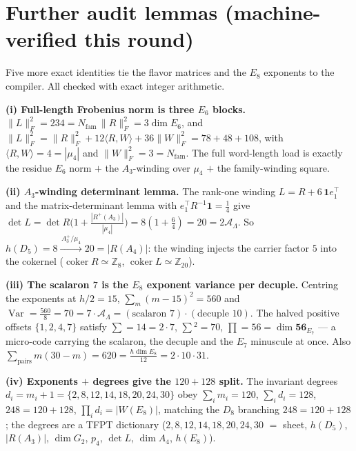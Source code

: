 \documentclass[11pt,a4paper]{article}
\newcommand{\Nfam}{N_{\mathrm{fam}}}
\newcommand{\AL}{\mathcal A_\Lambda}
\newcommand{\Z}{\mathbb{Z}}
\theoremstyle{definition}
\begin{document}
\section{Further audit lemmas (machine-verified this round)}
Five more exact identities tie the flavor matrices and the $E_8$ exponents to the compiler. All checked
with exact integer arithmetic.

\par\smallskip\noindent\textbf{(i) Full-length Frobenius norm is three $E_6$ blocks.}
$\|L\|_F^2=234=\Nfam\,\|R\|_F^2=3\dim E_6$, and
$\|L\|_F^2=\|R\|_F^2+12\langle R,W\rangle+36\|W\|_F^2=78+48+108$,
with $\langle R,W\rangle=4=|\mu_4|$ and $\|W\|_F^2=3=\Nfam$. The full word-length load is exactly the
residue $E_6$ norm $+$ the $A_3$-winding over $\mu_4$ $+$ the family-winding square. \mE

\par\smallskip\noindent\textbf{(ii) $A_3$-winding determinant lemma.}
The rank-one winding $L=R+6\,\mathbf 1 e_1^\top$ and the matrix-determinant lemma with
$e_1^\top R^{-1}\mathbf 1=\tfrac14$ give
$\det L=\det R\bigl(1+\tfrac{|R^+(A_3)|}{|\mu_4|}\bigr)=8(1+\tfrac64)=20=2\AL$.
So $h(D_5)=8\xrightarrow{\,A_3^+/\mu_4\,}20=|R(A_4)|$: the winding injects the carrier factor $5$ into
the cokernel ($\operatorname{coker}R\simeq\Z_8$, $\operatorname{coker}L\simeq\Z_{20}$). \mE

\par\smallskip\noindent\textbf{(iii) The scalaron $7$ is the $E_8$ exponent variance per decuple.}
Centring the exponents at $h/2=15$, $\sum_m(m-15)^2=560$ and
$\operatorname{Var}=\tfrac{560}{8}=70=7\cdot\AL=(\text{scalaron }7)\cdot(\text{decuple }10)$.
The halved positive offsets $\{1,2,4,7\}$ satisfy $\sum=14=2\cdot7$, $\sum{}^2=70$, $\prod=56=\dim\mathbf{56}_{E_7}$
--- a micro-code carrying the scalaron, the decuple and the $E_7$ minuscule at once.
Also $\sum_{\text{pairs}}m(30-m)=620=\tfrac{h\dim E_8}{12}=2\cdot10\cdot31$. \mE

\par\smallskip\noindent\textbf{(iv) Exponents $+$ degrees give the $120{+}128$ split.}
The invariant degrees $d_i=m_i+1=\{2,8,12,14,18,20,24,30\}$ obey
$\sum_i m_i=120$, $\sum_i d_i=128$, $248=120+128$, $\prod_i d_i=|W(E_8)|$,
matching the $D_8$ branching $248=120+128$; the degrees are a TFPT dictionary
($2,8,12,14,18,20,24,30$ $=$ sheet, $h(D_5)$, $|R(A_3)|$, $\dim G_2$, $p_4$, $\det L$, $\dim A_4$, $h(E_8)$). \mE
\end{document}
